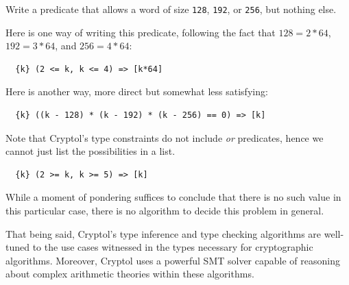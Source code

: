 \begin{Exercise}\label{ex:preds:1}
  Write a predicate that allows a word of size {\tt 128}, {\tt 192},
  or {\tt 256}, but nothing else.
\end{Exercise}
\begin{Answer}\indPredicates
  Here is one way of writing this predicate, following the fact that
  $128 = 2 * 64$, $192 = 3 * 64$, and $256 = 4 * 64$:
\begin{verbatim}
  {k} (2 <= k, k <= 4) => [k*64]
\end{verbatim}
Here is another way, more direct but somewhat less satisfying:
\begin{verbatim}
  {k} ((k - 128) * (k - 192) * (k - 256) == 0) => [k]
\end{verbatim}
Note that Cryptol's type constraints do not include {\em or} predicates, 
hence we cannot just list the possibilities in a list.
\end{Answer}

\begin{Verbatim}
  {k} (2 >= k, k >= 5) => [k]
\end{Verbatim}
While a moment of pondering suffices to conclude that there is no such
value in this particular case, there is no algorithm to decide this
problem in general.

That being said, Cryptol's type inference and type checking algorithms
are well-tuned to the use cases witnessed in the types necessary for
cryptographic algorithms.  Moreover, Cryptol uses a powerful SMT
solver capable of reasoning about complex arithmetic theories within
these algorithms.


